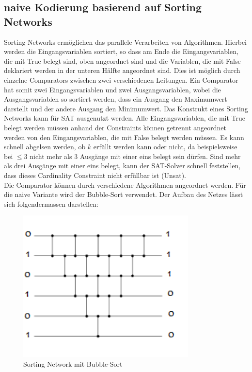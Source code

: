 \documentclass[a4,abstract=on]{scrartcl}
\begin{document}
	\subsection{naive Kodierung basierend auf Sorting Networks}
Sorting Networks ermöglichen das parallele Verarbeiten von Algorithmen. Hierbei werden die Eingangsvariablen sortiert, so dass am Ende die Eingangsvariablen, die mit True belegt sind, oben angeordnet sind und die Variablen, die mit False deklariert werden in der unteren Hälfte angeordnet sind. Dies ist möglich durch einzelne Comparators zwischen zwei verschiedenen Leitungen. Ein Comparator hat somit zwei Eingangsvariablen und zwei Ausgangsvariablen, wobei die Ausgangsvariablen so sortiert werden, dass ein Ausgang den Maximumwert darstellt und der andere Ausgang den Minimumwert. Das Konstrukt eines Sorting Networks kann für SAT ausgenutzt werden. Alle Eingangsvariablen, die mit True belegt werden müssen anhand der Constraints können getrennt angeordnet werden von den Eingangsvariablen, die mit False belegt werden müssen. Es kann schnell abgelsen werden, ob $k$ erfüllt werden kann oder nicht, da beispielsweise bei $\leq 3$ nicht mehr als 3 Ausgänge mit einer eins belegt sein dürfen. Sind mehr als drei Ausgänge mit einer eins belegt, kann der SAT-Solver schnell feststellen, dass dieses Cardinality Constraint nicht erfüllbar ist (Unsat).\\
Die Comparator können durch verschiedene Algorithmen angeordnet werden. Für die naive Variante wird der Bubble-Sort verwendet. Der Aufbau des Netzes lässt sich folgendermassen darstellen:\\

\begin{figure}[H]
\centering
\includegraphics[width=9cm]{sorting_network_bubble.png}
\caption{Sorting Network mit Bubble-Sort}
\label{fig:sorting_network_naiv_bsp}
\end{figure}
\end{document}
